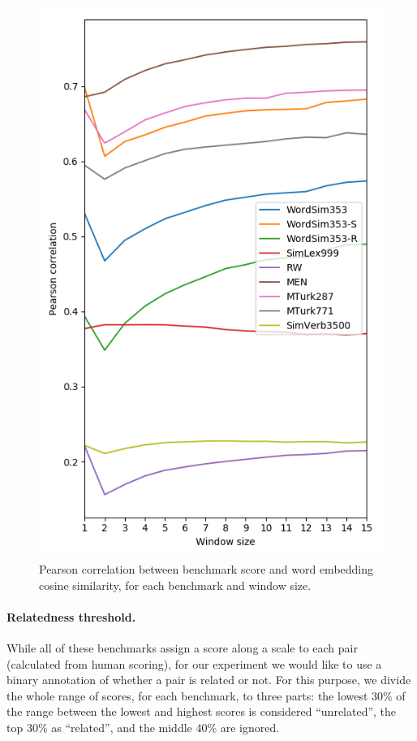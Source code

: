 \documentclass[11pt,a4paper]{article}
\begin{document}
    \begin{figure}[ht]
        \includegraphics[width=\columnwidth]{figs/distances_fasttext_enwiki-20170501-clean_cbow-300d-min500_eval.png}
	    \caption{Pearson correlation between benchmark score and word embedding cosine similarity,
	    for each benchmark and window size.
	    \label{fig:benchmark_correlation}}
	\end{figure}

    \paragraph{Relatedness threshold.}
    
    While all of these benchmarks assign a score along a scale to each pair
    (calculated from human scoring), for our experiment we would like to use
    a binary annotation of whether a pair is related or not.
    For this purpose, we divide the whole range of scores,
    for each benchmark, to three parts:
    the lowest 30\% of the range between the lowest and highest scores
    is considered ``unrelated'', the top 30\% as ``related'',
    and the middle 40\% are ignored.
    
\end{document}
